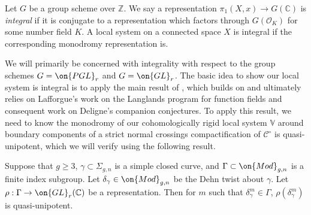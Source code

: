 \begin{definition}
\notready
	\label{definition:}
	Let $G$ be a group scheme over $\mathbb{Z}$. We say a representation $\pi_1(X, x) \to G(\mathbb C)$ is {\em integral}
if it is conjugate to a representation which factors through $G(\mathscr
O_K)$ for some number field $K$.
A local system on a connected space $X$ is integral if the corresponding monodromy representation is.
\end{definition}
We will primarily be concerned with integrality with respect to the group
schemes $G = \on{PGL}_r$ and $G = \on{GL}_r$.
The basic idea to show our local system is integral is to apply the main result of
\cite{klevdalP:g-rigid-local-systems-are-integral}, which builds on \cite{esnault2018cohomologically} and ultimately relies on Lafforgue's work on the Langlands program for function fields and consequent work on Deligne's companion conjectures.
To apply this result, we need to know the monodromy of our cohomologically rigid
local system $\mathbb{V}$ around boundary components of a strict normal crossings compactification of $\mathscr{C}^\circ$
is quasi-unipotent, which we will verify using the following result.

\begin{proposition}
\notready
			\label{proposition:quasi-unipotent-dehn}
	Suppose that $g \geq 3$, $\gamma \subset \Sigma_{g,n}$ is a simple closed curve,
	and $\Gamma\subset \on{Mod}_{g,n}$ is a
finite index subgroup. Let $\delta_\gamma\in\on{Mod}_{g,n}$ be the Dehn twist about $\gamma$. Let $\rho: \Gamma\to \on{GL}_r(\mathbb{C})$ be a representation. Then for $m$ such that $\delta_\gamma^m\in \Gamma$, $\rho(\delta_\gamma^m)$ is quasi-unipotent.
\end{proposition}


